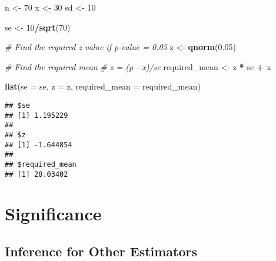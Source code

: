 \documentclass[]{book}
\newenvironment{Shaded}{\begin{snugshade}}{\end{snugshade}}
\newcommand{\CommentTok}[1]{\textcolor[rgb]{0.56,0.35,0.01}{\textit{#1}}}
\newcommand{\DataTypeTok}[1]{\textcolor[rgb]{0.13,0.29,0.53}{#1}}
\newcommand{\DecValTok}[1]{\textcolor[rgb]{0.00,0.00,0.81}{#1}}
\newcommand{\FloatTok}[1]{\textcolor[rgb]{0.00,0.00,0.81}{#1}}
\newcommand{\KeywordTok}[1]{\textcolor[rgb]{0.13,0.29,0.53}{\textbf{#1}}}
\newcommand{\NormalTok}[1]{#1}
\newcommand{\OperatorTok}[1]{\textcolor[rgb]{0.81,0.36,0.00}{\textbf{#1}}}
\newcommand{\StringTok}[1]{\textcolor[rgb]{0.31,0.60,0.02}{#1}}
\begin{document}
\begin{Shaded}
\begin{Highlighting}[]
\NormalTok{n <-}\StringTok{ }\DecValTok{70}
\NormalTok{x <-}\StringTok{ }\DecValTok{30}
\NormalTok{sd <-}\StringTok{ }\DecValTok{10}

\NormalTok{se <-}\StringTok{ }\DecValTok{10}\OperatorTok{/}\KeywordTok{sqrt}\NormalTok{(}\DecValTok{70}\NormalTok{)}

\CommentTok{# Find the required z value if p-value = 0.05}
\NormalTok{z <-}\StringTok{ }\KeywordTok{qnorm}\NormalTok{(}\FloatTok{0.05}\NormalTok{)}

\CommentTok{# Find the required mean}
\CommentTok{# z = (p - x)/se}
\NormalTok{required_mean <-}\StringTok{ }\NormalTok{z }\OperatorTok{*}\StringTok{ }\NormalTok{se }\OperatorTok{+}\StringTok{ }\NormalTok{x}

\KeywordTok{list}\NormalTok{(}\DataTypeTok{se =}\NormalTok{ se, }\DataTypeTok{z =}\NormalTok{ z, }\DataTypeTok{required_mean =}\NormalTok{ required_mean)}
\end{Highlighting}
\end{Shaded}

\begin{verbatim}
## $se
## [1] 1.195229
## 
## $z
## [1] -1.644854
## 
## $required_mean
## [1] 28.03402
\end{verbatim}

\hypertarget{significance}{%
\section*{Significance}\label{significance}}

\hypertarget{inference-for-other-estimators}{%
\subsection*{Inference for Other Estimators}\label{inference-for-other-estimators}}
\end{document}
